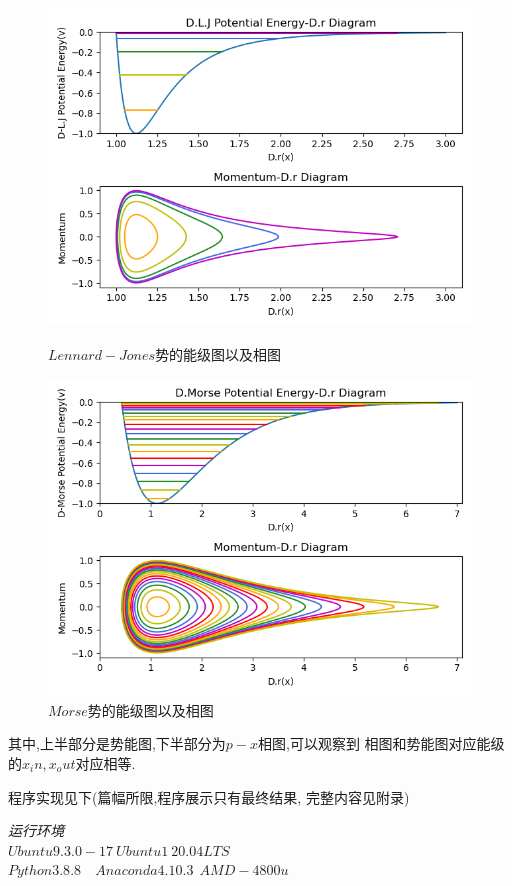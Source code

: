 \documentclass[11pt, a4paper, oneside]{ctexart}
\begin{document}
{{{{{\begin{figure}[!ht]
            \centering
            \includegraphics[scale=0.8]{h2lj.png}
            \vspace{-4mm}\caption{ $Lennard-Jones$势的能级图以及相图}
            \vspace{4mm}
            \includegraphics[scale=0.8]{h2morse.png}
            \caption{ $Morse$势的能级图以及相图}
        \end{figure} 
    }

    其中,上半部分是势能图,下半部分为$p-x$相图,可以观察到
    相图和势能图对应能级的$x_in,x_out$对应相等.


    程序实现见下(篇幅所限,程序展示只有最终结果,
    完整内容见附录)
    \begin{flushright}
        \scriptsize\emph{运行环境\\$Ubuntu 9.3.0-17\ Ubuntu1~20.04LTS$}\\
        \scriptsize\emph{$Python 3.8.8$\ \ $Anaconda 4.10.3\ \  AMD-4800u$}
            

\end{flushright}}}}}
\end{document}
